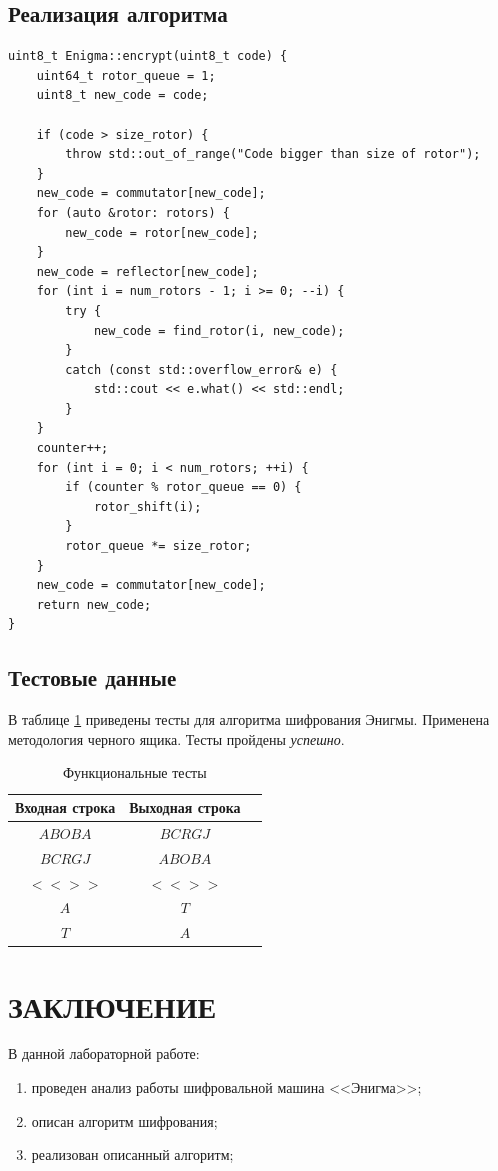 \subsection{Реализация алгоритма}

\begin{lstlisting}
uint8_t Enigma::encrypt(uint8_t code) {
    uint64_t rotor_queue = 1;
    uint8_t new_code = code;

    if (code > size_rotor) {
        throw std::out_of_range("Code bigger than size of rotor");
    }
    new_code = commutator[new_code];
    for (auto &rotor: rotors) {
        new_code = rotor[new_code];
    }
    new_code = reflector[new_code];
    for (int i = num_rotors - 1; i >= 0; --i) {
        try {
            new_code = find_rotor(i, new_code);
        }
        catch (const std::overflow_error& e) {
            std::cout << e.what() << std::endl;
        }
    }
    counter++;
    for (int i = 0; i < num_rotors; ++i) {
        if (counter % rotor_queue == 0) {
            rotor_shift(i);
        }
        rotor_queue *= size_rotor;
    }
    new_code = commutator[new_code];
    return new_code;
}
\end{lstlisting}


\subsection{Тестовые данные}

В таблице \ref{tbl:functional_test} приведены тесты для алгоритма шифрования Энигмы. 
Применена методология черного ящика. Тесты пройдены \textit{успешно}.



\begin{table}[ht!]
	\begin{center}
		\captionsetup{justification=raggedright,singlelinecheck=off}
		\caption{\label{tbl:functional_test} Функциональные тесты}
		\begin{tabular}{|c|c|c|}
			\hline
			Входная строка & Выходная строка \\ 
			\hline
			$ABOBA$ & $BCRGJ$\\
			$BCRGJ$  & $ABOBA$\\
			$<<>>$  & $<<>>$ \\
            $A$ & $T$\\
			$T$  & $A$\\
			\hline
		\end{tabular}
	\end{center}
\end{table}

\clearpage
\section*{\large{ЗАКЛЮЧЕНИЕ}}
В данной лабораторной работе:
\begin{enumerate}
    \item проведен анализ работы шифровальной машина <<Энигма>>;
    \item описан алгоритм шифрования;
    \item реализован описанный алгоритм;
\end{enumerate}
